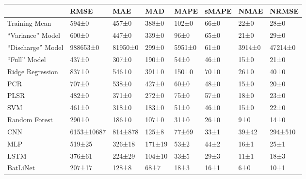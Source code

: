 \begin{tabular}{llllllll}
\toprule
 & RMSE & MAE & MAD & MAPE & sMAPE & NMAE & NRMSE \\
\midrule
Training Mean & 594±0 & 457±0 & 388±0 & 102±0 & 66±0 & 22±0 & 28±0 \\
``Variance'' Model & 600±0 & 447±0 & 339±0 & 96±0 & 65±0 & 21±0 & 29±0 \\
``Discharge'' Model & 988653±0 & 81950±0 & 299±0 & 5951±0 & 61±0 & 3914±0 & 47214±0 \\
``Full'' Model & 437±0 & 307±0 & 190±0 & 54±0 & 46±0 & 15±0 & 21±0 \\
Ridge Regression & 837±0 & 546±0 & 391±0 & 150±0 & 70±0 & 26±0 & 40±0 \\
PCR & 707±0 & 538±0 & 427±0 & 60±0 & 48±0 & 15±0 & 20±0 \\
PLSR & 482±0 & 371±0 & 272±0 & 75±0 & 57±0 & 18±0 & 23±0 \\
SVM & 461±0 & 318±0 & 183±0 & 51±0 & 46±0 & 15±0 & 22±0 \\
Random Forest & 290±0 & 186±0 & 107±0 & 31±0 & 26±0 & 9±0 & 14±0 \\
CNN & 6153±10687 & 814±878 & 125±8 & 77±69 & 33±1 & 39±42 & 294±510 \\
MLP & 519±25 & 326±18 & 171±19 & 53±2 & 44±2 & 16±1 & 25±1 \\
LSTM & 376±61 & 224±29 & 104±10 & 33±5 & 29±3 & 11±1 & 18±3 \\
BatLiNet & 207±17 & 128±8 & 68±7 & 18±3 & 16±1 & 6±0 & 10±1 \\
\bottomrule
\end{tabular}

